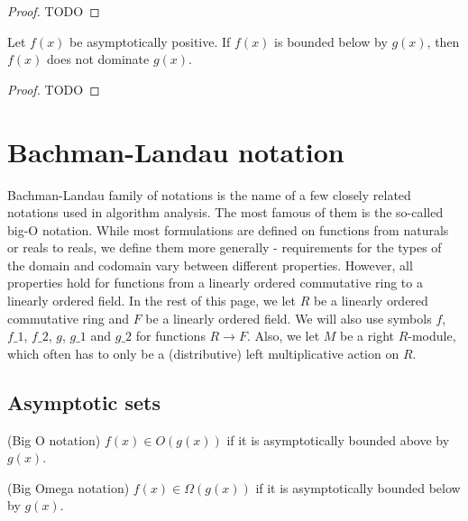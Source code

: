 \begin{proof}
    TODO 
\end{proof}

\begin{lemma}
    \label{thm:asymp_bounded_above_imp_not_left_dom}
    \leanok
    Let $f(x)$ be asymptotically positive. If $f(x)$ is bounded below by $g(x)$, then $f(x)$ 
    does not dominate $g(x)$.
\end{lemma}

\begin{proof}
    TODO 
\end{proof}


\section{Bachman-Landau notation}

Bachman-Landau family of notations is the name of a few closely related notations used in 
algorithm analysis. The most famous of them is the so-called big-O notation. While
most formulations are defined on functions from naturals or reals to reals, we define 
them more generally - requirements for the types of the domain and codomain vary between 
different properties. However, all properties hold for functions from a linearly ordered 
commutative ring to a linearly ordered field. In the rest of this page, we let $R$ be a linearly 
ordered commutative ring and $F$ be a linearly ordered field. We will also use symbols $f$, 
$f\_1$, $f\_2$, $g$, $g\_1$ and $g\_2$ for functions $R \to F$. Also, we let $M$ be 
a right $R$-module, which often has to only be a (distributive) left multiplicative action
on $R$.


\subsection{Asymptotic sets}

\begin{definition}(Big O notation)
    \label{def:big_o}
    \leanok
    $f(x) \in O(g(x))$ if it is asymptotically bounded above by $g(x)$.
\end{definition}

\begin{definition}(Big Omega notation)
    \label{def:big_omega}
    \leanok
    $f(x) \in \Omega(g(x))$ if it is asymptotically bounded below by $g(x)$.
\end{definition}


